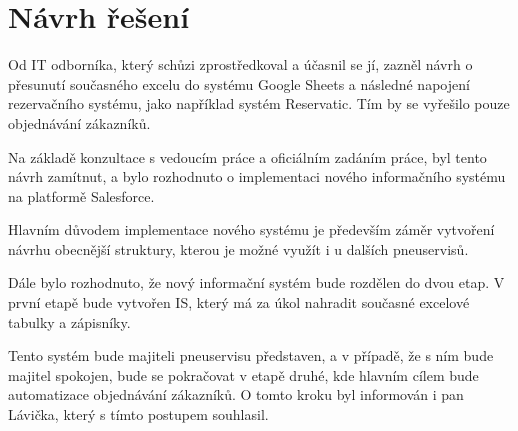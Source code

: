 \section{Návrh řešení} \label{sec:návrh_řešení}
Od IT odborníka, který schůzi zprostředkoval a účasnil se jí, zazněl návrh o přesunutí současného excelu do systému Google Sheets a následné napojení rezervačního systému, jako například systém Reservatic. Tím by se vyřešilo pouze objednávání zákazníků.

Na základě konzultace s vedoucím práce a oficiálním zadáním práce, byl tento návrh zamítnut, a bylo rozhodnuto o implementaci nového informačního systému na platformě Salesforce.

Hlavním důvodem implementace nového systému je především záměr vytvoření návrhu obecnější struktury, kterou je možné využít i u dalších pneuservisů.

Dále bylo rozhodnuto, že nový informační systém bude rozdělen do dvou etap. V první etapě bude vytvořen IS, který má za úkol nahradit současné excelové tabulky a zápisníky. 

Tento systém bude majiteli pneuservisu představen, a v případě, že s ním bude majitel spokojen, bude se pokračovat v etapě druhé, kde hlavním cílem bude automatizace objednávání zákazníků. O tomto kroku byl informován i pan Lávička, který s tímto postupem souhlasil.
